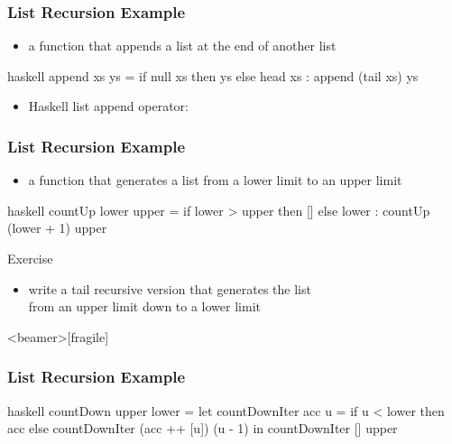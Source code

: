 \documentclass[dvipsnames]{beamer}
\theoremstyle{plain}
\begin{document}
\begin{frame}[fragile]
  \frametitle{List Recursion Example}

  \begin{example}
    \begin{itemize}
      \item a function that appends a list at the end of another list
    \end{itemize}

    \pause
    \begin{pygments}{haskell}
append xs ys =
    if null xs
    then ys
    else head xs : append (tail xs) ys
    \end{pygments}
  \end{example}

  \pause
  \begin{itemize}
    \item Haskell list append operator: 
  \end{itemize}
\end{frame}

\begin{frame}[fragile]
  \frametitle{List Recursion Example}

  \begin{example}
    \begin{itemize}
      \item a function that generates a list from a lower limit to an upper limit
    \end{itemize}

    \pause
    \begin{pygments}{haskell}
countUp lower upper =
    if lower > upper
    then []
    else lower : countUp (lower + 1) upper
    \end{pygments}
  \end{example}

  \pause
  \begin{block}{Exercise}
    \begin{itemize}
      \item write a tail recursive version that generates the list\\
        from an upper limit down to a lower limit
    \end{itemize}
  \end{block}
\end{frame}

\begin{frame}<beamer>[fragile]
  \frametitle{List Recursion Example}

  \begin{example}
    \begin{pygments}{haskell}
countDown upper lower =
    let
        countDownIter acc u =
            if u < lower
            then acc
            else countDownIter (acc ++ [u]) (u - 1)
    in
        countDownIter [] upper
    \end{pygments}

  \end{example}
\end{frame}
\end{document}
